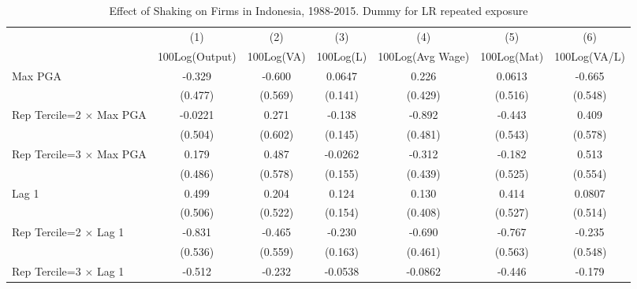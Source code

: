\begin{table}[htbp]\centering
\def\sym#1{\ifmmode^{#1}\else\(^{#1}\)\fi}
\caption{Effect of Shaking on Firms in Indonesia, 1988-2015. Dummy for LR repeated exposure}
\begin{tabular}{l*{6}{c}}
\toprule
                &\multicolumn{1}{c}{(1)}&\multicolumn{1}{c}{(2)}&\multicolumn{1}{c}{(3)}&\multicolumn{1}{c}{(4)}&\multicolumn{1}{c}{(5)}&\multicolumn{1}{c}{(6)}\\
                &\multicolumn{1}{c}{100Log(Output)}&\multicolumn{1}{c}{100Log(VA)}&\multicolumn{1}{c}{100Log(L)}&\multicolumn{1}{c}{100Log(Avg Wage)}&\multicolumn{1}{c}{100Log(Mat)}&\multicolumn{1}{c}{100Log(VA/L)}\\
\midrule
Max PGA         &   -0.329         &   -0.600         &   0.0647         &    0.226         &   0.0613         &   -0.665         \\
                &  (0.477)         &  (0.569)         &  (0.141)         &  (0.429)         &  (0.516)         &  (0.548)         \\
\addlinespace
Rep Tercile=2 $\times$ Max PGA&  -0.0221         &    0.271         &   -0.138         &   -0.892         &   -0.443         &    0.409         \\
                &  (0.504)         &  (0.602)         &  (0.145)         &  (0.481)         &  (0.543)         &  (0.578)         \\
\addlinespace
Rep Tercile=3 $\times$ Max PGA&    0.179         &    0.487         &  -0.0262         &   -0.312         &   -0.182         &    0.513         \\
                &  (0.486)         &  (0.578)         &  (0.155)         &  (0.439)         &  (0.525)         &  (0.554)         \\
\addlinespace
Lag 1           &    0.499         &    0.204         &    0.124         &    0.130         &    0.414         &   0.0807         \\
                &  (0.506)         &  (0.522)         &  (0.154)         &  (0.408)         &  (0.527)         &  (0.514)         \\
\addlinespace
Rep Tercile=2 $\times$ Lag 1&   -0.831         &   -0.465         &   -0.230         &   -0.690         &   -0.767         &   -0.235         \\
                &  (0.536)         &  (0.559)         &  (0.163)         &  (0.461)         &  (0.563)         &  (0.548)         \\
\addlinespace
Rep Tercile=3 $\times$ Lag 1&   -0.512         &   -0.232         &  -0.0538         &  -0.0862         &   -0.446         &   -0.179         \\

\end{tabular}
\end{table}
